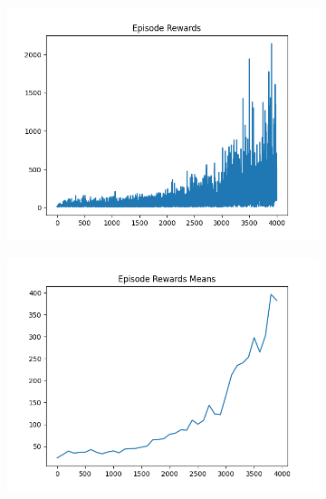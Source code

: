 \begin{figure}[H]
\begin{subfigure}{.47\linewidth}
        \includegraphics[width=\textwidth]{pole/2024-06-14_16-42-26_dqn_cartpole_episode_rewards.png}
    \end{subfigure}
    \begin{subfigure}{.47\linewidth}
        \centering
        \includegraphics[width=\textwidth]{pole/2024-06-14_16-42-26_dqn_cartpole_episode_rewards_means.png}
    \end{subfigure}
\end{figure}
